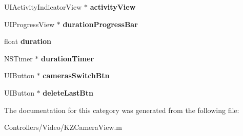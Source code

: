 \begin{DoxyCompactItemize}
\item 
\hypertarget{category_k_z_camera_view_07_08_a3d59c0a2d214906597a330cf42f15105}{}U\+I\+Activity\+Indicator\+View $\ast$ {\bfseries activity\+View}\label{category_k_z_camera_view_07_08_a3d59c0a2d214906597a330cf42f15105}

\item 
\hypertarget{category_k_z_camera_view_07_08_ad5bcabc8ffe3198c21127d124c65c37b}{}U\+I\+Progress\+View $\ast$ {\bfseries duration\+Progress\+Bar}\label{category_k_z_camera_view_07_08_ad5bcabc8ffe3198c21127d124c65c37b}

\item 
\hypertarget{category_k_z_camera_view_07_08_a6e499838f280a649eddf776c16842c79}{}float {\bfseries duration}\label{category_k_z_camera_view_07_08_a6e499838f280a649eddf776c16842c79}

\item 
\hypertarget{category_k_z_camera_view_07_08_aa4ac4c775ff8857e7a18a2153372ca7e}{}N\+S\+Timer $\ast$ {\bfseries duration\+Timer}\label{category_k_z_camera_view_07_08_aa4ac4c775ff8857e7a18a2153372ca7e}

\item 
\hypertarget{category_k_z_camera_view_07_08_ace71a05a483a8eca0da7a7c9900c06ff}{}U\+I\+Button $\ast$ {\bfseries cameras\+Switch\+Btn}\label{category_k_z_camera_view_07_08_ace71a05a483a8eca0da7a7c9900c06ff}

\item 
\hypertarget{category_k_z_camera_view_07_08_af14251beab1627f57235fc33678775fc}{}U\+I\+Button $\ast$ {\bfseries delete\+Last\+Btn}\label{category_k_z_camera_view_07_08_af14251beab1627f57235fc33678775fc}

\end{DoxyCompactItemize}


The documentation for this category was generated from the following file\+:\begin{DoxyCompactItemize}
\item 
Controllers/\+Video/K\+Z\+Camera\+View.\+m\end{DoxyCompactItemize}
